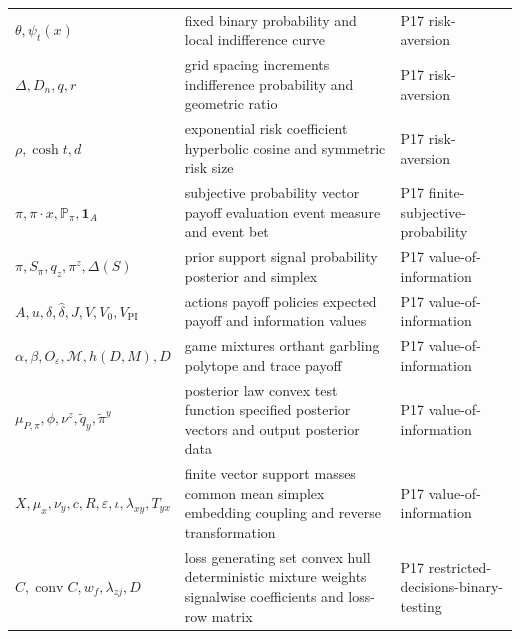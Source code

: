 \begin{longtable}{@{}p{}p{}p{}@{}}
\(\theta,\allowbreak \psi_t(x)\) & fixed binary probability and local indifference curve & P17 risk-\allowbreak{}aversion \\
\(\Delta,\allowbreak D_n,\allowbreak q,\allowbreak r\) & grid spacing increments indifference probability and geometric ratio & P17 risk-\allowbreak{}aversion \\
\(\rho,\allowbreak \cosh t,\allowbreak d\) & exponential risk coefficient hyperbolic cosine and symmetric risk size & P17 risk-\allowbreak{}aversion \\
\(\pi,\allowbreak \pi\cdot x,\allowbreak \mathbb P_\pi,\allowbreak \mathbf1_A\) & subjective probability vector payoff evaluation event measure and event bet & P17 finite-\allowbreak{}subjective-\allowbreak{}probability \\
\(\pi,\allowbreak S_\pi,\allowbreak q_z,\allowbreak \pi^z,\allowbreak \Delta(S)\) & prior support signal probability posterior and simplex & P17 value-\allowbreak{}of-\allowbreak{}information \\
\(A,\allowbreak u,\allowbreak \delta,\allowbreak \widehat\delta,\allowbreak J,\allowbreak V,\allowbreak V_0,\allowbreak V_{\mathrm{PI}}\) & actions payoff policies expected payoff and information values & P17 value-\allowbreak{}of-\allowbreak{}information \\
\(\alpha,\allowbreak \beta,\allowbreak O_\varepsilon,\allowbreak \mathcal M,\allowbreak h(D,\allowbreak M),\allowbreak D\) & game mixtures orthant garbling polytope and trace payoff & P17 value-\allowbreak{}of-\allowbreak{}information \\
\(\mu_{P,\pi},\allowbreak \phi,\allowbreak \nu^z,\allowbreak \widetilde q_y,\allowbreak \widetilde\pi^y\) & posterior law convex test function specified posterior vectors and output posterior data & P17 value-\allowbreak{}of-\allowbreak{}information \\
\(X,\allowbreak \mu_x,\allowbreak \nu_y,\allowbreak c,\allowbreak R,\allowbreak \varepsilon,\allowbreak \iota,\allowbreak \lambda_{xy},\allowbreak T_{yx}\) & finite vector support masses common mean simplex embedding coupling and reverse transformation & P17 value-\allowbreak{}of-\allowbreak{}information \\
\(C,\allowbreak \operatorname{conv}C,\allowbreak w_f,\allowbreak \lambda_{zj},\allowbreak D\) & loss generating set convex hull deterministic mixture weights signalwise coefficients and loss-row matrix & P17 restricted-\allowbreak{}decisions-\allowbreak{}binary-\allowbreak{}testing \\

\end{longtable}
